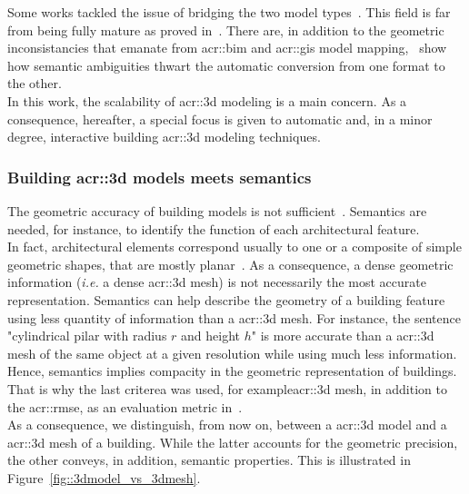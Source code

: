             Some works tackled the issue of bridging the two model types~\parencite{deng2016mapping}.
            This field is far from being fully mature as proved in~\textcite{stoter2018geo}.
            There are, in addition to the geometric inconsistancies that emanate from \gls{acr::bim} and \gls{acr::gis} model mapping,~\textcite{stoter2018geo} show how semantic ambiguities thwart the automatic conversion from one format to the other.\\

            In this work, the scalability of \gls{acr::3d} modeling is a main concern.
            As a consequence, hereafter, a special focus is given to automatic and, in a minor degree, interactive building \gls{acr::3d} modeling techniques.

        \subsubsection{Building \gls*{acr::3d} models meets semantics}
            The geometric accuracy of building models is not sufficient~\parencite{biljecki2016improved}.
            Semantics are needed, for instance, to identify the function of each architectural feature.\\
            In fact, architectural elements correspond usually to one or a composite of simple geometric shapes, that are mostly planar~\parencite{kolbe2005citygml}.
            As a consequence, a dense geometric information (\textit{i.e.} a dense \gls{acr::3d} mesh) is not necessarily the most accurate representation.
            Semantics can help describe the geometry of a building feature using less quantity of information than a \gls{acr::3d} mesh.
            For instance, the sentence "cylindrical pilar with radius $r$ and height $h$" is more accurate than a \gls{acr::3d} mesh of the same object at a given resolution while using much less information.
            Hence, semantics implies compacity in the geometric representation of buildings.
            That is why the last criterea was used, for example\gls{acr::3d} mesh, in addition to the \gls{acr::rmse}, as an evaluation metric in~\textcite{lafarge_ijcv12}.\\
            As a consequence, we distinguish, from now on, between a \gls{acr::3d} model and a \gls{acr::3d} mesh of a building.
            While the latter accounts for the geometric precision, the other conveys, in addition, semantic properties.
            This is illustrated in Figure~\ref{fig::3dmodel_vs_3dmesh}.\\

